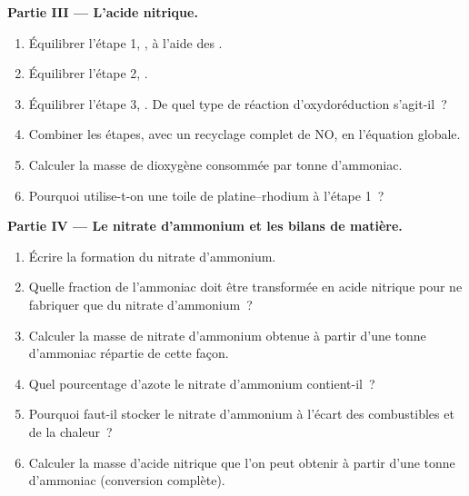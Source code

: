 \begin{problem}
\medskip
\noindent\textbf{Partie III --- L'acide nitrique.}
\begin{enumerate}[resume]
  \item Équilibrer l'étape 1, , à l'aide des . %
  \item Équilibrer l'étape 2, . %
  \item Équilibrer l'étape 3, . De quel type %
        de réaction d'oxydoréduction s'agit-il~?
  \item Combiner les étapes, avec un recyclage complet de NO, en
        l'équation globale.
  \item Calculer la masse de dioxygène consommée par tonne d'ammoniac.
  \item Pourquoi utilise-t-on une toile de platine--rhodium à l'étape 1~?
\end{enumerate}

\medskip
\noindent\textbf{Partie IV --- Le nitrate d'ammonium et les bilans de matière.}
\begin{enumerate}[resume]
  \item Écrire la formation du nitrate d'ammonium.
  \item Quelle fraction de l'ammoniac doit être transformée en acide
        nitrique pour ne fabriquer que du nitrate d'ammonium~?
  \item Calculer la masse de nitrate d'ammonium obtenue à partir d'une
        tonne d'ammoniac répartie de cette façon.
  \item Quel pourcentage d'azote le nitrate d'ammonium contient-il~?
  \item Pourquoi faut-il stocker le nitrate d'ammonium à l'écart des
        combustibles et de la chaleur~?
  \item Calculer la masse d'acide nitrique que l'on peut obtenir à partir
        d'une tonne d'ammoniac (conversion complète).
\end{enumerate}
\end{problem}

